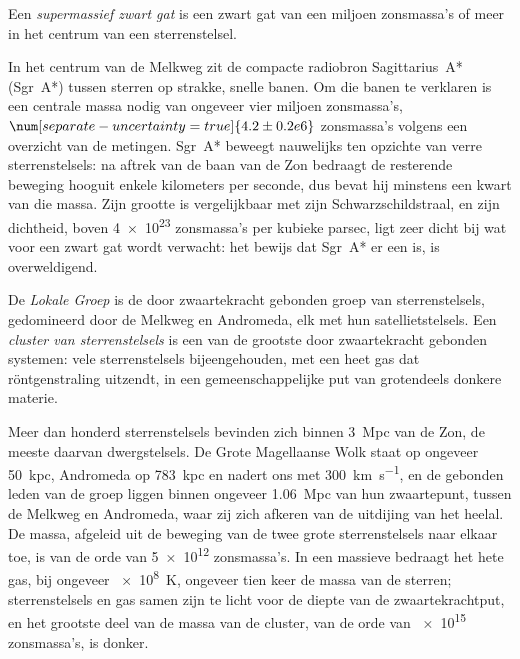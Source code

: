 \begin{definition}\label{def:b3:milky-way-galaxies:smbh}
Een \emph{supermassief zwart gat} is een zwart
gat van een miljoen zonsmassa's of meer in het centrum van een sterrenstelsel.
\end{definition}

In het centrum van de Melkweg zit de compacte radiobron Sagittarius~A*
(Sgr~A*) tussen sterren op strakke, snelle banen. Om die banen te verklaren
is een centrale massa nodig van ongeveer vier miljoen zonsmassa's,
$\num[separate-uncertainty=true]{4.2 \pm 0.2 e6}$ zonsmassa's volgens een overzicht van de metingen. Sgr~A* beweegt nauwelijks
ten opzichte van verre sterrenstelsels: na aftrek van de baan van de Zon
bedraagt de resterende beweging hooguit enkele kilometers per seconde, dus
bevat hij minstens een kwart van die massa. Zijn grootte is vergelijkbaar
met zijn Schwarzschildstraal, en zijn dichtheid, boven \num{4e23} zonsmassa's
per kubieke parsec, ligt zeer dicht bij wat voor een zwart gat wordt verwacht:
het bewijs dat Sgr~A* er een is, is overweldigend.

\begin{definition}\label{def:b3:milky-way-galaxies:groups}
De \emph{Lokale Groep} is de door zwaartekracht gebonden
groep van sterrenstelsels, gedomineerd door de Melkweg en Andromeda, elk met
hun satellietstelsels. Een \emph{cluster van sterrenstelsels} is
een van de grootste door zwaartekracht gebonden systemen: vele sterrenstelsels
bijeengehouden, met een heet gas dat röntgenstraling uitzendt, in een gemeenschappelijke
put van grotendeels donkere materie.
\end{definition}

Meer dan honderd sterrenstelsels bevinden zich binnen \qty{3}{Mpc} van de Zon, de meeste
daarvan dwergstelsels. De Grote Magellaanse Wolk staat op ongeveer \qty{50}{kpc}, Andromeda op
\qty{783}{kpc} en nadert ons met \qty{300}{km.s^{-1}}, en de gebonden
leden van de groep liggen binnen ongeveer \qty{1.06}{Mpc} van hun zwaartepunt,
tussen de Melkweg en Andromeda, waar zij zich afkeren van de
uitdijing van het heelal. De massa, afgeleid uit de beweging van de twee grote
sterrenstelsels naar elkaar toe, is van de orde van \num{5e12} zonsmassa's. In een
massieve  bedraagt het hete gas, bij ongeveer \qty{e8}{K},
ongeveer tien keer de massa van de sterren; sterrenstelsels en gas samen zijn te licht voor
de diepte van de zwaartekrachtput, en het grootste deel van de massa van de cluster,
van de orde van \num{e15} zonsmassa's, is donker.


